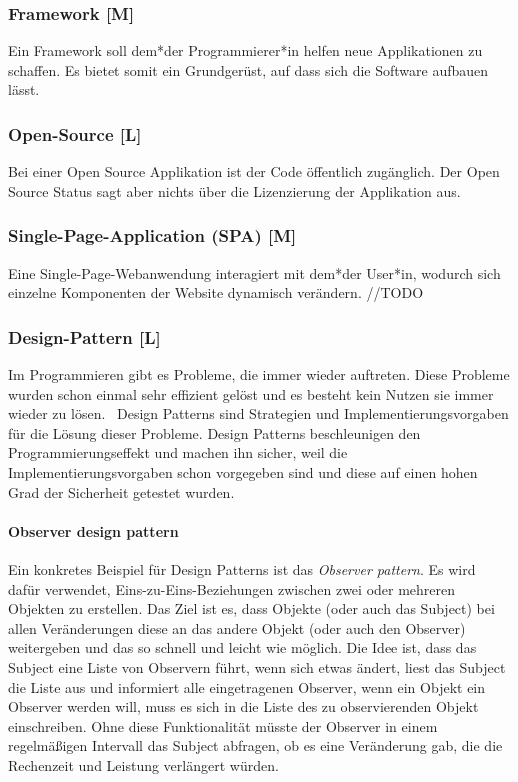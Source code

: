 \subsubsection{Framework [M]}

Ein Framework soll dem*der Programmierer*in helfen neue Applikationen zu schaffen. Es bietet somit ein Grundgerüst, auf dass sich die Software aufbauen lässt.  

\subsubsection{Open-Source [L]}
Bei einer Open Source Applikation ist der Code öffentlich zugänglich. Der Open Source Status sagt aber nichts über die Lizenzierung der Applikation aus. 

\subsubsection{Single-Page-Application (SPA) [M]}
Eine Single-Page-Webanwendung interagiert mit dem*der User*in, wodurch sich einzelne Komponenten der Website dynamisch verändern. //TODO

\subsubsection{Design-Pattern [L]}
Im Programmieren gibt es Probleme, die immer wieder auftreten. Diese Probleme wurden schon einmal sehr effizient gelöst und es besteht kein Nutzen sie immer wieder zu lösen.  Design Patterns sind Strategien und Implementierungsvorgaben für die Lösung dieser Probleme. Design Patterns beschleunigen den Programmierungseffekt und machen ihn sicher, weil die Implementierungsvorgaben schon vorgegeben sind und diese auf einen hohen Grad der Sicherheit getestet wurden. \cite{DesignPatterns}

\paragraph{Observer design pattern}
\label{txt:glos:observerDesignPattern}
Ein konkretes Beispiel für Design Patterns ist das \emph{Observer pattern}. Es wird dafür verwendet, Eins-zu-Eins-Beziehungen zwischen zwei oder mehreren Objekten zu erstellen. Das Ziel ist es, dass Objekte (oder auch das Subject) bei allen Veränderungen diese an das andere Objekt (oder auch den Observer) weitergeben und das so schnell und leicht wie möglich. Die Idee ist, dass das Subject eine Liste von Observern führt, wenn sich etwas ändert, liest das Subject die Liste aus und informiert alle eingetragenen Observer, wenn ein Objekt ein Observer werden will, muss es sich in die Liste des zu observierenden Objekt einschreiben. Ohne diese Funktionalität müsste der Observer in einem regelmäßigen Intervall das Subject abfragen, ob es eine Veränderung gab, die die Rechenzeit und Leistung verlängert würden. \cite{ObserverPatternExplaination}

